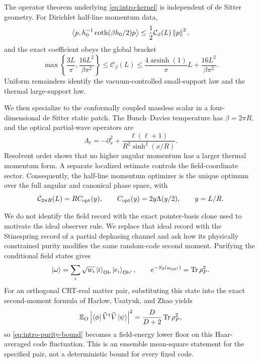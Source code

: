 The operator theorem underlying \cref{eq:intro-kernel} is independent of de
Sitter geometry.  For Dirichlet half-line momentum data,
\begin{equation}
 \left\langle p,h_0^{-1}\coth(\beta h_0/2)p\right\rangle
 \leq \frac12\mathcal C_\beta(L)\left\lVert p\right\rVert^2,
 \label{eq:intro-half-line-bound}
\end{equation}
and the exact coefficient obeys the global bracket
\begin{equation}
 \max\left\{\frac{3L}{\pi},\frac{16L^2}{\beta\pi^2}\right\}
 \leq\mathcal C_\beta(L)
 \leq\frac{4\operatorname{arsinh}(1)}\pi L
      +\frac{16L^2}{\beta\pi^2}.
 \label{eq:intro-general-bracket}
\end{equation}
Uniform remainders identify the vacuum-controlled small-support law and the
thermal large-support law.

We then specialize to the conformally coupled massless scalar in a
four-dimensional de Sitter static patch.  The Bunch--Davies temperature has
$\beta=2\pi R$, and the optical partial-wave operators are
\begin{equation}
 A_\ell=-\partial_x^2+\frac{\ell(\ell+1)}
 {R^2\sinh^2(x/R)}.
\end{equation}
Resolvent order shows that no higher angular momentum has a larger thermal
momentum form.  A separate localized estimate controls the field-coordinate
sector.  Consequently, the half-line momentum optimizer is the unique
optimum over the full angular and canonical phase space, with
\begin{equation}
 \mathcal C_{2\pi R}(L)=R C_{\rm opt}(y),
 \qquad C_{\rm opt}(y)=2y\Lambda(y/2),
 \qquad y=L/R.
 \label{eq:intro-de-sitter-cost}
\end{equation}

We do not identify the field record with the exact pointer-basis clone used to
motivate the ideal observer rule.  We replace that ideal record with the
Stinespring record of a partial dephasing channel and ask how its physically
constrained purity modifies the same random-code second moment.  Purifying the
conditional field states gives
\begin{equation}
 \left\lvert\omega\right\rangle=\sum_i\sqrt{w_i}\left\lvert i\right\rangle_{\rm Ob}\left\lvert e_i\right\rangle_{\rm Ob'},
 \qquad e^{-S_2(\omega_{\rm Ob'})}=\operatorname{Tr}\rho_P^2.
 \label{eq:intro-record-state}
\end{equation}
For an orthogonal CRT-real matter pair, substituting this state into the exact
second-moment formula of Harlow, Usatyuk, and Zhao yields
\begin{equation}
 \mathbb E_O
 \left\lvert\left\langle\phi\right\rvert\widehat V^\dagger\widehat V\left\lvert\psi\right\rangle\right\rvert^2
 =\frac{D}{D+2}\operatorname{Tr}\rho_P^2,
 \label{eq:intro-harlow-insertion}
\end{equation}
so \cref{eq:intro-purity-bound} becomes a field-energy lower floor on this
Haar-averaged code fluctuation.  This is an ensemble mean-square statement
for the specified pair, not a deterministic bound for every fixed code.

